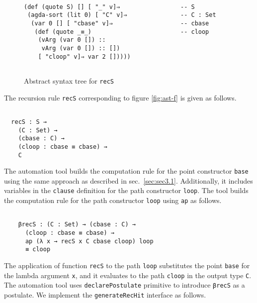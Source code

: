 \documentclass[sigplan,10pt]{acmart}
\begin{document}
\begin{figure}
\begin{center}
\begingroup
\fontsize{7pt}{9pt}\selectfont
\begin{Verbatim}

(def (quote S) [] [ "_" v]⇒                 -- S
 (agda-sort (lit 0) [ "C" v]⇒               -- C : Set
  (var 0 [] [ "cbase" v]⇒                   -- cbase
   (def (quote _≡_)                         -- cloop
    (vArg (var 0 []) ::
     vArg (var 0 []) :: [])
    [ "cloop" v]⇒ var 2 []))))
    
\end{Verbatim}
\endgroup
\end{center}
\caption{Abstract syntax tree for {\tt recS}}
\label{fig:ast-f}
\end{figure}

The recursion rule {\tt recS} corresponding to figure \eqref{fig:ast-f} is given as follows.

\begin{center}
\begingroup
\begin{BVerbatim}

  recS : S → 
    (C : Set) →
    (cbase : C) →
    (cloop : cbase ≡ cbase) →
    C

\end{BVerbatim}
\endgroup
\end{center}

The automation tool builds the computation rule for the point constructor {\tt base} using the same approach as described in sec.~\ref{sec:sec3.1}. Additionally, it includes variables in the {\tt clause} definition for the path constructor {\tt loop}. The tool builds the computation rule for the path constructor {\tt loop} using {\tt ap} as follows.

\begin{center}
\begingroup
\begin{BVerbatim}

    βrecS : (C : Set) → (cbase : C) → 
      (cloop : cbase ≡ cbase) → 
      ap (λ x → recS x C cbase cloop) loop 
      ≡ cloop
\end{BVerbatim}
\endgroup
\end{center}

The application of function {\tt recS} to the path {\tt loop} substitutes the point {\tt base} for the lambda argument {\tt x}, and it evaluates to the path {\tt cloop} in the output type {\tt C}. The automation tool uses {\tt declarePostulate} primitive to introduce {\tt βrecS} as a postulate. We implement the {\tt generateRecHit} interface as follows.
\end{document}
